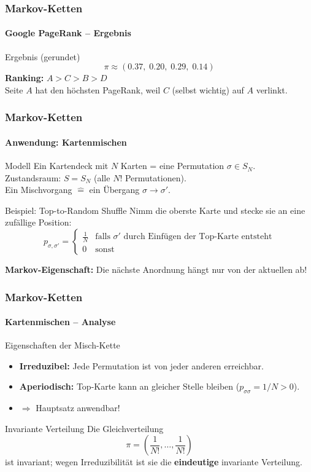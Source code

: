 \documentclass{beamer}
\begin{document}
\begin{frame}
    \frametitle{Markov-Ketten}
\framesubtitle{Google PageRank -- Ergebnis}
    \begin{block}{Ergebnis (gerundet)}
\[
\pi \approx (0.37,\; 0.20,\; 0.29,\; 0.14)
\]
\textbf{Ranking:} $A > C > B > D$\\[0.2cm]
Seite $A$ hat den höchsten PageRank, weil $C$ (selbst wichtig) auf $A$ verlinkt.
\end{block}
 \end{frame}



\begin{frame}
    \frametitle{Markov-Ketten}
\framesubtitle{Anwendung: Kartenmischen}
    \begin{block}{Modell}
Ein Kartendeck mit $N$ Karten = eine Permutation $\sigma \in S_N$.\\[0.2cm]
Zustandsraum: $S = S_N$ (alle $N!$ Permutationen).\\[0.1cm]
Ein Mischvorgang $\hat{=}$ ein Übergang $\sigma \to \sigma'$.
\end{block}
\begin{block}{Beispiel: Top-to-Random Shuffle}
Nimm die oberste Karte und stecke sie an eine zufällige Position:
\[
p_{\sigma, \sigma'} = \begin{cases} \frac{1}{N} & \text{falls } \sigma' \text{ durch Einfügen der Top-Karte entsteht} \\ 0 & \text{sonst} \end{cases}
\]
\end{block}
\textbf{Markov-Eigenschaft:} Die nächste Anordnung hängt nur von der aktuellen ab!
 \end{frame}



\begin{frame}
    \frametitle{Markov-Ketten}
\framesubtitle{Kartenmischen -- Analyse}
    \begin{block}{Eigenschaften der Misch-Kette}
\begin{itemize}
\item \textbf{Irreduzibel:} Jede Permutation ist von jeder anderen erreichbar.
\item \textbf{Aperiodisch:} Top-Karte kann an gleicher Stelle bleiben ($p_{\sigma\sigma} = 1/N > 0$).
\item $\Rightarrow$ Hauptsatz anwendbar!
\end{itemize}
\end{block}
\begin{block}{Invariante Verteilung}
Die Gleichverteilung
\[
\pi = \left(\frac{1}{N!}, \ldots, \frac{1}{N!}\right)
\]
ist invariant; wegen Irreduzibilität ist sie die \textbf{eindeutige} invariante Verteilung.
\end{block}
 \end{frame}
\end{document}

